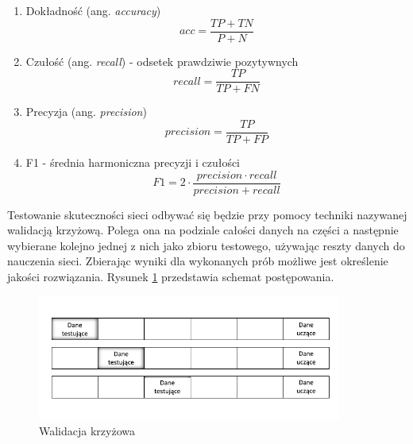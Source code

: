 \documentclass[inzynierska]{pwr_wmat_praca_dyplomowa}
\theoremstyle{plain}
\numberwithin{theorem}{chapter}
\theoremstyle{definition}
\numberwithin{theorem}{chapter}
\begin{document}
\begin{center}
	\begin{enumerate}
		\item Dokładność (ang. \textit{accuracy})
		\begin{equation}
		acc = \frac{TP + TN}{P + N}
		\end{equation}
		\item Czułość (ang. \textit{recall}) - odsetek prawdziwie pozytywnych
		\begin{equation}
		recall = \frac{TP}{TP + FN}
		\end{equation}
		\item Precyzja (ang. \textit{precision})
		\begin{equation}
		precision = \frac{TP}{TP + FP}
		\end{equation}
		\item F1 - średnia harmoniczna precyzji i czułości 
		\begin{equation}
		F1 = 2 \cdot \frac{precision \cdot recall}{precision + recall}
		\end{equation}
	\end{enumerate}
	
\end{center}

Testowanie skuteczności sieci odbywać się będzie przy pomocy techniki nazywanej walidacją krzyżową. Polega ona na podziale całości danych na części a następnie wybierane kolejno jednej z nich jako zbioru testowego, używając reszty danych do nauczenia sieci. Zbierając wyniki dla wykonanych prób możliwe jest określenie jakości rozwiązania. Rysunek \ref{cross-validation} przedstawia schemat postępowania.
\begin{figure}[ht]
	\centering
	\includegraphics[width=10cm]{images/walidacja_c.pdf}
	\caption{Walidacja krzyżowa}
	\label{cross-validation}
\end{figure}
\end{document}
